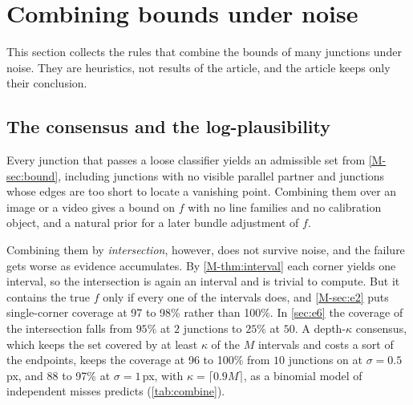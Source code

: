 \section{Combining bounds under noise}\label{sec:Scombine}

This section collects the rules that combine the bounds of many junctions under noise. They are heuristics, not results of the article, and the article keeps only their conclusion.

\subsection{The consensus and the log-plausibility}\label{sec:prior}

Every junction that passes a loose classifier yields an admissible set from \cref{M-sec:bound}, including junctions with no visible parallel partner and junctions whose edges are too short to locate a vanishing point. Combining them over an image or a video gives a bound on $f$ with no line families and no calibration object, and a natural prior for a later bundle adjustment of $f$.

Combining them by \emph{intersection}, however, does not survive noise, and the failure gets worse as evidence accumulates. By \cref{M-thm:interval} each corner yields one interval, so the intersection is again an interval and is trivial to compute. But it contains the true $f$ only if every one of the intervals does, and \cref{M-sec:e2} puts single-corner coverage at 97 to 98\% rather than 100\%. In \cref{sec:e6} the coverage of the intersection falls from $95\%$ at $2$ junctions to $25\%$ at $50$. A depth-$\kappa$ consensus, which keeps the set covered by at least $\kappa$ of the $M$ intervals and costs a sort of the endpoints, keeps the coverage at 96 to 100\% from $10$ junctions on at $\sigma=0.5$\,px, and 88 to 97\% at $\sigma=1$\,px, with $\kappa=\lceil0.9M\rceil$, as a binomial model of independent misses predicts (\cref{tab:combine}). 

